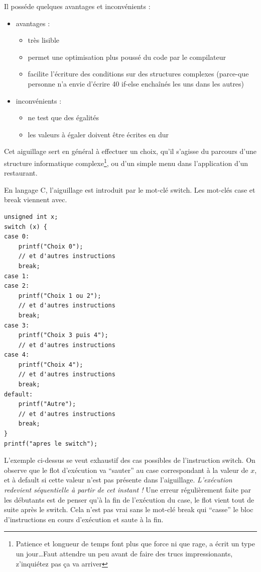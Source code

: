 \documentclass[../../../main.tex]{subfiles}
\begin{document}
Il posséde quelques avantages et inconvénients :
\begin{itemize}
	\item avantages :
	\begin{itemize}
		\item très lisible
		\item permet une optimisation plus poussé du code par le compilateur
		\item facilite l'écriture des conditions sur des structures complexes (parce-que personne n'a envie d'écrire 40 \textsf{if-else} enchaînés les uns dans les autres)
	\end{itemize}
	\item inconvénients : 
	\begin{itemize}
		\item ne test que des égalités
		\item les valeurs à égaler doivent être écrites en dur
	\end{itemize}
\end{itemize}
Cet aiguillage sert en général à effectuer un choix, qu'il s'agisse du parcours d'une structure informatique complexe\footnote{Patience et longueur de temps font plus que force ni que rage, a écrit un type un jour\dots Faut attendre un peu avant de faire des trucs impressionants, z'inquiétez pas ça va arriver}, ou d'un simple menu dans l'application d'un restaurant.
 
En langage C, l'aiguillage est introduit par le mot-clé \textsf{switch}. Les mot-clés \textsf{case} et \textsf{break} viennent avec.
\begin{verbatim}
unsigned int x;
switch (x) {
case 0:
	printf("Choix 0");
	// et d'autres instructions
	break;
case 1:
case 2:
	printf("Choix 1 ou 2");
	// et d'autres instructions
	break;
case 3:
	printf("Choix 3 puis 4");
	// et d'autres instructions
case 4:
	printf("Choix 4");
	// et d'autres instructions
	break;
default:
	printf("Autre");
	// et d'autres instructions
	break;
}
printf("apres le switch");
\end{verbatim}
L'exemple ci-dessus se veut exhaustif des cas possibles de l'instruction \textsf{switch}. On observe que le flot d'exécution va ``sauter'' au \textsf{case} correspondant à la valeur de $x$, et à \textsf{default} si cette valeur n'est pas présente dans l'aiguillage. \textit{L'exécution redevient séquentielle à partir de cet instant !} Une erreur régulièrement faite par les débutants est de penser qu'à la fin de l'exécution du \textsf{case}, le flot vient tout de suite après le switch. Cela n'est pas vrai sans le mot-clé \textsf{break} qui ``casse'' le bloc d'instructions en cours d'exécution et saute à la fin.
 
\end{document}
